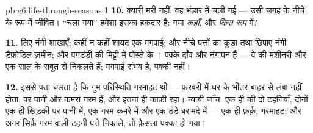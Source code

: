 \begin{solution}{pb:g6:life-through-seasons:1}
\textbf{10.} क्यारी मरी नहीं: वह भंडार में चली गई --- उसी जगह के नीचे
 के रूप में जीवित। ``चला गया'' हमेशा इसका हक़दार है: गया
\emph{कहाँ}, और \emph{किस रूप} में?

\textbf{11.}  लिए नंगी शाखाएँ; कहीं न कहीं शायद एक मगपाई; और
नीचे पत्तों का कूड़ा तथा  छिपाए नंगी डैफ़ोडिल-ज़मीन; और पगडंडी
की मिट्टी में पोस्ते के । पक्के दाँव  और नंगापन हैं --- वे 
की  मशीनरी और एक साल के सबूत से निकलते हैं; मगपाई संभव है, पक्की
नहीं।

\textbf{12.} इससे पता चलता है कि गुम परिस्थिति गरमाहट थी --- फ़रवरी में
घर के भीतर  बाहर से लंबा नहीं होता, पर पानी और कमरा गरम हैं, और
इतना ही काफ़ी रहा। न्यायी जाँच: एक ही  की दो टहनियाँ, दोनों एक ही
खिड़की पर पानी में, एक गरम कमरे में और एक ठंडे बरामदे में --- एक ही
फ़र्क़, गरमाहट; और अगर सिर्फ़ गरम वाली टहनी पत्ते निकाले, तो फ़ैसला पक्का
हो गया।
\end{solution}
